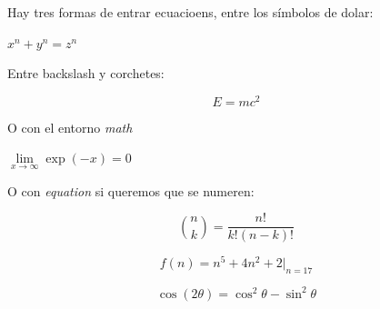 Hay tres formas de entrar ecuacioens, entre los símbolos de dolar:

$x^n + y^n = z^n$

Entre backslash y corchetes:

\[ E=mc^2 \]

O con el entorno \textit{math}

\begin{math}
    \lim\limits_{x \to \infty} \exp(-x) = 0
\end{math}

O con \textit{equation} si queremos que se numeren:

\begin{equation}
    \binom{n}{k} = \frac{n!}{k!(n-k)!}
\end{equation}

\begin{equation}
    f(n) = n^5 + 4n^2 + 2 |_{n=17}
\end{equation}

\begin{equation}
    \cos (2\theta) = \cos^2 \theta - \sin^2 \theta
\end{equation}
